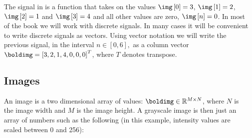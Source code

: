 %




%
The signal in  is a function that takes on the values $\img \left[0\right] = 3$, $\img \left[1\right] = 2$, $\img \left[2\right] = 1$ and $\img \left[3\right] = 4$ and all other values are zero, $\img \left[n\right] = 0$. In most of the book we will work with discrete signals. In many cases it will be convenient to write discrete signals as vectors. Using vector notation we will write the previous signal, in the interval $n \in \left[0,6 \right],$ as a column vector $\boldimg = \left[3, 2, 1, 4, 0, 0, 0\right]^T$, where $T$ denotes transpose.
%


\subsection{Images}

An image is a two dimensional array of values: $\boldimg \in \mathbb{R}^{M \times N}$, where $N$ is the image width and $M$ is the image height. A grayscale image is then just an array of numbers such as the following (in this example, intensity values are scaled between 0 and 256):


